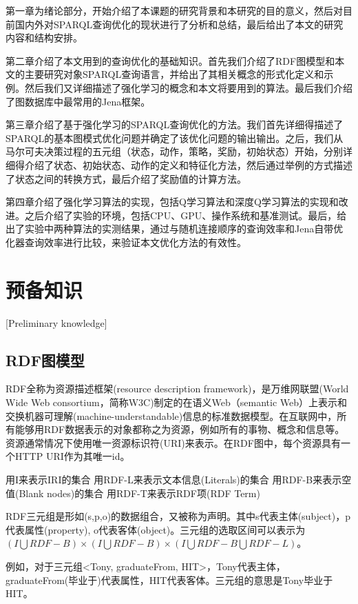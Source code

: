 第一章为绪论部分，开始介绍了本课题的研究背景和本研究的目的意义，然后对目前国内外对SPARQL查询优化的现状进行了分析和总结，最后给出了本文的研究内容和结构安排。

第二章介绍了本文用到的查询优化的基础知识。首先我们介绍了RDF图模型和本文的主要研究对象SPARQL查询语言，并给出了其相关概念的形式化定义和示例。然后我们又详细描述了强化学习的概念和本文将要用到的算法。最后我们介绍了图数据库中最常用的Jena框架。

第三章介绍了基于强化学习的SPARQL查询优化的方法。我们首先详细得描述了SPARQL的基本图模式优化问题并确定了该优化问题的输出输出。之后，我们从马尔可夫决策过程的五元组（状态，动作，策略，奖励，初始状态）开始，分别详细得介绍了状态、初始状态、动作的定义和特征化方法，然后通过举例的方式描述了状态之间的转换方式，最后介绍了奖励值的计算方法。

第四章介绍了强化学习算法的实现，包括Q学习算法和深度Q学习算法的实现和改进。之后介绍了实验的环境，包括CPU、GPU、操作系统和基准测试。最后，给出了实验中两种算法的实测结果，通过与随机连接顺序的查询效率和Jena自带优化器查询效率进行比较，来验证本文优化方法的有效性。

\chapter{预备知识}[Preliminary knowledge]

\section{RDF图模型}

RDF全称为资源描述框架(resource description framework)，是万维网联盟(World Wide Web consortium，简称W3C)制定的在语义Web（semantic Web）上表示和交换机器可理解(machine-understandable)信息的标准数据模型。在互联网中，所有能够用RDF数据表示的对象都称之为资源，例如所有的事物、概念和信息等。资源通常情况下使用唯一资源标识符(URI)来表示。在RDF图中，每个资源具有一个HTTP URI作为其唯一id。

 \begin{definition}    
    用I来表示IRI的集合
    用RDF-L来表示文本信息(Literals)的集合
    用RDF-B来表示空值(Blank nodes)的集合
    用RDF-T来表示RDF项(RDF Term)
\end{definition}

\begin{definition}[（RDF三元组）]    
    RDF三元组是形如(s,p,o)的数据组合，又被称为声明。其中s代表主体(subject)，p代表属性(property),
    o代表客体(object)。三元组的选取区间可以表示为$(I\bigcup RDF-B)\times(I\bigcup RDF-B)\times(I\bigcup RDF-B\bigcup RDF-L)$。
    
    例如，对于三元组<Tony, graduateFrom, HIT>，Tony代表主体，graduateFrom(毕业于)代表属性，HIT代表客体。三元组的意思是Tony毕业于HIT。
\end{definition}

